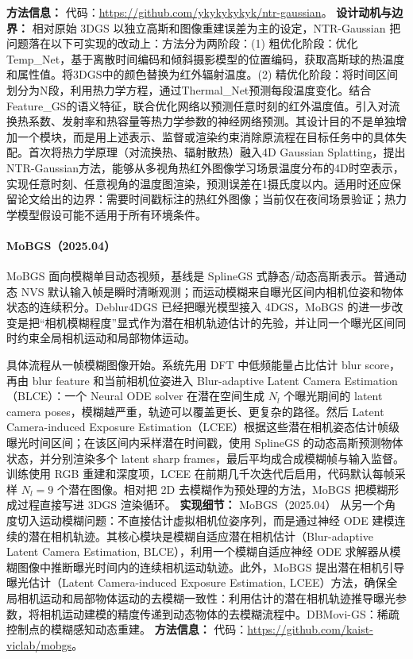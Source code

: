 \textbf{方法信息：} 代码：\url{https://github.com/ykykykykyk/ntr-gaussian}。
\textbf{设计动机与边界：} 相对原始 3DGS 以独立高斯和图像重建误差为主的设定，NTR-Gaussian 把问题落在以下可实现的改动上：方法分为两阶段：(1) 粗优化阶段：优化Temp\_Net，基于离散时间编码和倾斜摄影模型的位置编码，获取高斯球的热温度和属性值。将3DGS中的颜色替换为红外辐射温度。(2) 精优化阶段：将时间区间划分为N段，利用热力学方程，通过Thermal\_Net预测每段温度变化。结合Feature\_GS的语义特征，联合优化网络以预测任意时刻的红外温度值。引入对流换热系数、发射率和热容量等热力学参数的神经网络预测。其设计目的不是单独增加一个模块，而是用上述表示、监督或渲染约束消除原流程在目标任务中的具体失配。首次将热力学原理（对流换热、辐射散热）融入4D Gaussian Splatting，提出NTR-Gaussian方法，能够从多视角热红外图像学习场景温度分布的4D时空表示，实现任意时刻、任意视角的温度图渲染，预测误差在1摄氏度以内。适用时还应保留论文给出的边界：需要时间戳标注的热红外图像；当前仅在夜间场景验证；热力学模型假设可能不适用于所有环境条件。
\paragraph{MoBGS（2025.04）\cite{2504_15122}}
MoBGS 面向模糊单目动态视频，基线是 SplineGS 式静态/动态高斯表示。普通动态 NVS 默认输入帧是瞬时清晰观测；而运动模糊来自曝光区间内相机位姿和物体状态的连续积分。Deblur4DGS 已经把曝光模型接入 4DGS，MoBGS 的进一步改变是把“相机模糊程度”显式作为潜在相机轨迹估计的先验，并让同一个曝光区间同时约束全局相机运动和局部物体运动。

具体流程从一帧模糊图像开始。系统先用 DFT 中低频能量占比估计 blur score，再由 blur feature 和当前相机位姿进入 Blur-adaptive Latent Camera Estimation（BLCE）：一个 Neural ODE solver 在潜在空间生成 $N_l$ 个曝光期间的 latent camera poses，模糊越严重，轨迹可以覆盖更长、更复杂的路径。然后 Latent Camera-induced Exposure Estimation（LCEE）根据这些潜在相机姿态估计帧级曝光时间区间；在该区间内采样潜在时间戳，使用 SplineGS 的动态高斯预测物体状态，并分别渲染多个 latent sharp frames，最后平均成合成模糊帧与输入监督。训练使用 RGB 重建和深度项，LCEE 在前期几千次迭代后启用，代码默认每帧采样 $N_l=9$ 个潜在图像。相对把 2D 去模糊作为预处理的方法，MoBGS 把模糊形成过程直接写进 3DGS 渲染循环。
\textbf{实现细节：} MoBGS（2025.04） 从另一个角度切入运动模糊问题：不直接估计虚拟相机位姿序列，而是通过神经 ODE 建模连续的潜在相机轨迹。其核心模块是模糊自适应潜在相机估计（Blur-adaptive Latent Camera Estimation, BLCE），利用一个模糊自适应神经 ODE 求解器从模糊图像中推断曝光时间内的连续相机运动轨迹。此外，MoBGS 提出潜在相机引导曝光估计（Latent Camera-induced Exposure Estimation, LCEE）方法，确保全局相机运动和局部物体运动的去模糊一致性：利用估计的潜在相机轨迹推导曝光参数，将相机运动建模的精度传递到动态物体的去模糊流程中。DBMovi-GS：稀疏控制点的模糊感知动态重建。
\textbf{方法信息：} 代码：\url{https://github.com/kaist-viclab/mobgs}。



